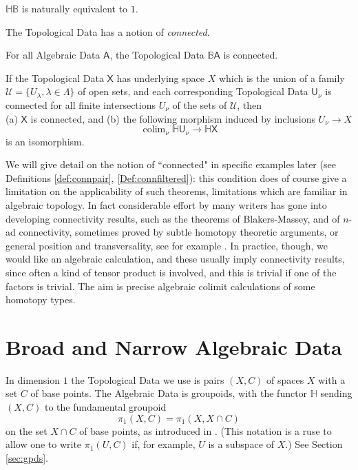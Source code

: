 \documentclass{elsarticle}
\def\B{\beta}
\def\B{\beta}
\def\colim{\mathrm{colim }}
\def\colim{\mathop{\rm colim}\nolimits}
\def\H{\mathbb H}
\def\B{\mathbb B}
\def\colim{\operatorname{colim}}
\begin{document}
\begin{crit}
$\H \B$ is naturally equivalent to $1$. \label{crit2}
\end{crit}
\begin{crit}
The Topological Data has a notion of {\it connected}.  \label{crit3}
\end{crit}
\begin{crit}
For all Algebraic Data $\mathsf A$, the Topological Data $\B \mathsf A$ is connected.   \label{crit4}
\end{crit}

\begin{crit}
If the Topological Data $\mathsf X$ has underlying space $X$ which is the union of a family $\mathcal U= \{U_\lambda, \lambda \in \Lambda\}$ of open sets, and each corresponding Topological Data
$ \mathsf U_\nu$ is connected for all finite intersections $U_\nu$ of the sets of $\mathcal U$, then \\(a) $\mathsf X$ is connected, and (b) the following morphism induced by inclusions $U_\nu \to X$
\begin{equation*}
  \colim_\nu \H \mathsf U_\nu \to \H \mathsf X
\end{equation*}
is an isomorphism.
  \label{crit5}
\end{crit}

We will give detail on the notion of ``connected" in specific examples later (see Definitions \ref{def:connpair}, \ref{Def:connfiltered}): this condition does of course give a limitation on the applicability of such theorems, limitations which are familiar in algebraic topology. In fact considerable effort by many writers has gone into developing connectivity results, such as the theorems of Blakers-Massey, and of $n$-ad connectivity, sometimes proved by subtle homotopy theoretic arguments, or general position and transversality, see for example \cite{cubhom}. In practice, though, we would like an algebraic calculation, and these usually imply connectivity results, since often a kind of tensor product is involved, and this is trivial if one of the factors is trivial.
The aim is precise algebraic colimit calculations of some homotopy types.



\section{Broad and Narrow Algebraic Data}\label{sec:nbdata}
In dimension $1$ the Topological Data we use is pairs $(X,C)$ of  spaces $X$ with a set $C$ of base points. The Algebraic Data is groupoids, with the functor $\H$ sending
$(X,C)$ to the fundamental groupoid $$\pi_1(X,C)= \pi_1(X,X \cap C)$$ on the set $X \cap C$ of base points, as introduced in \cite{B67}. (This notation is a ruse to allow one to write $\pi_1(U,C)$ if, for example, $U$ is a subspace of $X$.) See Section \ref{sec:gpds}.
\end{document}
